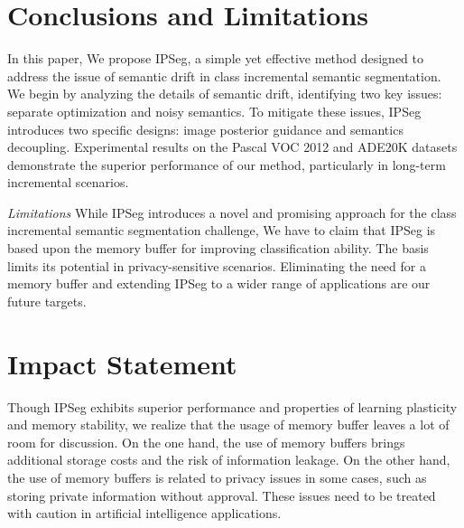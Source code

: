 \section{Conclusions and Limitations}
\label{sec:Conclusions}
In this paper, We propose IPSeg, a simple yet effective method designed to address the issue of semantic drift in class incremental semantic segmentation. We begin by analyzing the details of semantic drift, identifying two key issues: separate optimization and noisy semantics. To mitigate these issues, IPSeg introduces two specific designs: image posterior guidance and semantics decoupling. Experimental results on the Pascal VOC 2012 and ADE20K datasets demonstrate the superior performance of our method, particularly in long-term incremental scenarios.

\textit{Limitations} While IPSeg introduces a novel and promising approach for the class incremental semantic segmentation challenge, We have to claim that IPSeg is based upon the memory buffer for improving classification ability. The basis limits its potential in privacy-sensitive scenarios. Eliminating the need for a memory buffer and extending IPSeg to a wider range of applications are our future targets.

\section*{Impact Statement} Though IPSeg exhibits superior performance and properties of learning plasticity and memory stability, we realize that the usage of memory buffer leaves a lot of room for discussion. On the one hand, the use of memory buffers brings additional storage costs and the risk of information leakage. On the other hand, the use of memory buffers is related to privacy issues in some cases, such as storing private information without approval. These issues need to be treated with caution in artificial intelligence applications.
